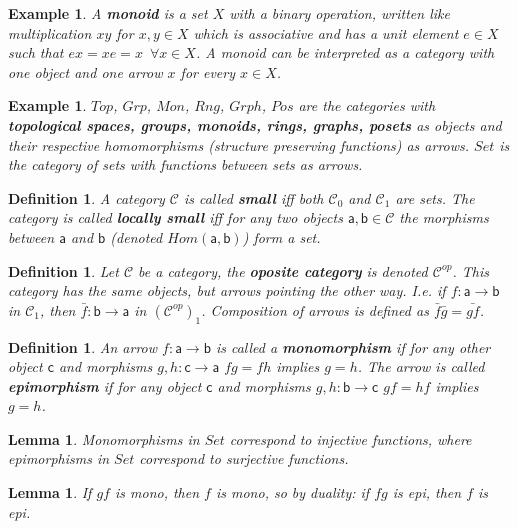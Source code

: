 \documentclass{article}
\newcommand{\cat}[1]{\mathcal{#1}} %
\newcommand{\cato}[1]{\cat{#1}_0} %
\newcommand{\catm}[1]{\cat{#1}_1} %
\newcommand{\ob}[1]{\mathsf{#1}} %
\newcommand{\catop}[1]{\cat{#1}^{op}}
\newcommand{\catopm}[1]{(\catop{#1})_1}
\newcommand{\all}{\enspace \forall}
\newcommand{\allin}[2]{\all #1 \in #2}
\newtheorem{lemma}[theorem]{Lemma}
\newtheorem{definition}[theorem]{Definition}
\newtheorem{example}[theorem]{Example}
\begin{document}
\begin{example}
	A \textbf{monoid} is a set $X$ with a binary operation, written like multiplication $xy$ for $x,y \in X$ which is associative and has a unit element $e \in X$ such that $ex = xe = x \allin{x}{X}$.
	A monoid can be interpreted as a category with one object and one arrow $x$ for every $x \in X$.
\end{example}

\begin{example}
	$Top$, $Grp$, $Mon$, $Rng$, $Grph$, $Pos$ are the categories with \textbf{topological spaces, groups, monoids, rings, graphs, posets} as objects and their respective homomorphisms (structure preserving functions) as arrows.
	$Set$ is the category of sets with functions between sets as arrows.
\end{example}

\begin{definition}
	A category $\cat{C}$ is called \textbf{small} iff both $\cato{C}$ and $\catm{C}$ are sets. The category is called \textbf{locally small}
	iff for any two objects $\ob{a},\ob{b} \in \cat{C}$ the morphisms between $\ob{a}$ and $\ob{b}$ (denoted $Hom(\ob{a},\ob{b})$) form a set.
\end{definition}

\begin{definition}
	Let $\cat{C}$ be a category, the \textbf{oposite category} is denoted $\catop{C}$. This category has the same objects, but arrows pointing the other way.
	I.e. if $f: \ob{a} \rightarrow \ob{b}$ in $\catm{C}$, then $\bar{f}: \ob{b} \rightarrow \ob{a}$ in $\catopm{C}$. Composition of arrows is defined as $\bar{f}\bar{g} = \bar{gf}$.
\end{definition}

\begin{definition}
	An arrow $f: \ob{a} \rightarrow \ob{b}$ is called a \textbf{monomorphism} if for any other object $\ob{c}$ and morphisms $g,h: \ob{c} \rightarrow \ob{a}$ $fg = fh$ implies $g=h$.
	The arrow is called \textbf{epimorphism} if for any object $\ob{c}$ and morphisms $g,h: \ob{b} \rightarrow \ob{c}$ $gf = hf$ implies $g=h$.
\end{definition}

\begin{lemma}
	Monomorphisms in $Set$ correspond to injective functions, where epimorphisms in $Set$ correspond to surjective functions.
\end{lemma}

\begin{lemma}
	If $gf$ is mono, then $f$ is mono, so by duality: if $fg$ is epi, then $f$ is epi.
\end{lemma}
\end{document}
